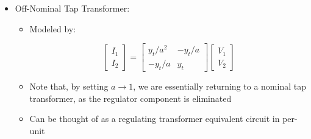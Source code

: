 \begin{itemize}
\begin{itemize}
    \end{itemize}

  \item Off-Nominal Tap Transformer:

    \begin{itemize}

      \item Modeled by:

        $$\left[ \begin{matrix} I_1\\I_2\end{matrix} \right]=\left[ \begin{matrix} y_t/a^2 & -y_t/a\\ -y_t/a & y_t\end{matrix} \right]\left[\begin{matrix} V_1\\V_2 \end{matrix}\right]$$

      \item Note that, by setting $a\to 1$, we are essentially returning to a nominal tap transformer, as the regulator component is eliminated

      \item Can be thought of as a regulating transformer equivalent circuit in per-unit

    \end{itemize}

\end{itemize}



